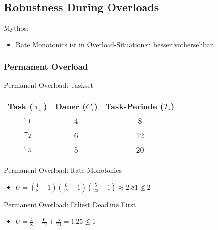\subsection{Robustness During Overloads}\label{RobustnessDuringOverloads}

\begin{frame}{Mythos:}
	\begin{itemize}
		\item Rate Monotonics ist in Overload-Situationen besser vorhersehbar.
	\end{itemize}
\end{frame}

\subsubsection{Permanent Overload}
\begin{frame}{Permanent Overload: Taskset}
	\begin{center}
		\begin{tabular}{c||c|c}
			Task ($\uptau_i$) & Dauer ($C_i$) & Task-Periode ($T_i$)\\\hline\hline
			$\uptau_1$ & 4 & 8\\
			$\uptau_2$ & 6 & 12\\
			$\uptau_3$ & 5 & 20
		\end{tabular}
		
	\end{center}
\end{frame}

\begin{frame}{Permanent Overload: Rate Monotonics}
\begin{itemize}
			\item $U=(\frac{4}{8}+1)(\frac{6}{12}+1)(\frac{5}{20}+1)\approx 2.81 \nleq 2$\pause		
		\end{itemize}				

		
\end{frame}

\begin{frame}{Permanent Overload: Erliest Deadline First}
	\begin{center}
		\begin{itemize}
			\item $U=\frac{4}{8}+\frac{6}{12}+\frac{5}{20}=1.25 \nleq 1$\pause		
		\end{itemize}

	
	\end{center}
\end{frame}

